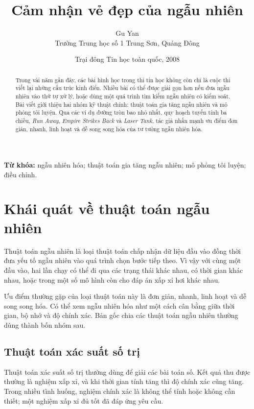 \documentclass[11pt]{article}
\title{Cảm nhận vẻ đẹp của ngẫu nhiên}
\author{Gu Yan\\Trường Trung học số 1 Trung Sơn, Quảng Đông}
\date{Trại đông Tin học toàn quốc, 2008}
\begin{document}
\maketitle


\renewcommand{\abstractname}{Tóm tắt}
\begin{abstract}
Trong vài năm gần đây, các bài hình học trong thi tin học không còn chỉ là
cuộc thi viết lại những cấu trúc kinh điển. Nhiều bài có thể được giải gọn hơn
nếu đưa ngẫu nhiên vào thứ tự xử lý, hoặc dùng một quá trình tìm kiếm ngẫu
nhiên có kiểm soát. Bài viết giới thiệu hai nhóm kỹ thuật chính: thuật toán gia
tăng ngẫu nhiên và mô phỏng tôi luyện. Qua các ví dụ đường tròn bao nhỏ nhất,
quy hoạch tuyến tính ba chiều, \textit{Run Away}, \textit{Empire Strikes Back}
và \textit{Laser Tank}, tác giả nhấn mạnh ưu điểm đơn giản, nhanh, linh hoạt và
dễ song song hóa của tư tưởng ngẫu nhiên hóa.
\end{abstract}

\noindent\textbf{Từ khóa:} ngẫu nhiên hóa; thuật toán gia tăng ngẫu nhiên;
mô phỏng tôi luyện; điều chỉnh.

\section{Khái quát về thuật toán ngẫu nhiên}

Thuật toán ngẫu nhiên là loại thuật toán chấp nhận dữ liệu đầu vào đồng thời
đưa yếu tố ngẫu nhiên vào quá trình chọn bước tiếp theo. Vì vậy với cùng một
đầu vào, hai lần chạy có thể đi qua các trạng thái khác nhau, có thời gian
khác nhau, hoặc trong một số mô hình còn cho đáp án xấp xỉ hơi khác nhau.

Ưu điểm thường gặp của loại thuật toán này là đơn giản, nhanh, linh hoạt và dễ
song song hóa. Có thể xem ngẫu nhiên hóa như một cách cân bằng giữa thời gian,
bộ nhớ và độ chính xác. Bản gốc chia các thuật toán ngẫu nhiên thường dùng
thành bốn nhóm sau.

\subsection{Thuật toán xác suất số trị}

Thuật toán xác suất số trị thường dùng để giải các bài toán số. Kết quả thu
được thường là nghiệm xấp xỉ, và khi thời gian tính tăng thì độ chính xác cũng
tăng. Trong nhiều tình huống, nghiệm chính xác là không thể tính hoặc không
cần thiết; một nghiệm xấp xỉ đủ tốt đã đáp ứng yêu cầu.
\end{document}
